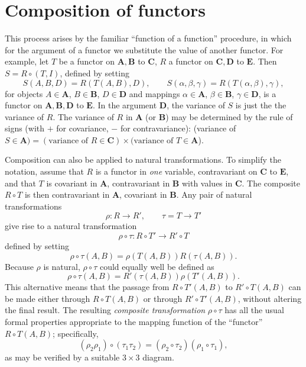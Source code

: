 \documentclass[11pt,a4paper]{report}
\begin{document}
\section{Composition of functors}\label{sec:funct_comp}
This process arises by the familiar ``function of a function'' procedure, in which for the argument of a
functor we substitute the value of another functor. For example, let $T$ be a functor on $\mathbf{A,B}$
to $\mathbf{C}$, $R$ a functor on $\mathbf{C,D}$ to $\mathbf{E}$. Then $S=R\circ (T,I)$, defined by
setting
\begin{equation*}
	S(A,B,D) = R(T(A,B),D),\qquad S(\alpha,\beta,\gamma)= R(T(\alpha,\beta),\gamma),
\end{equation*}
for objects $A\in\mathbf{A}$, $B\in\mathbf{B}$, $D\in\mathbf{D}$ and mappings $\alpha\in\mathbf{A}$,
$\beta\in\mathbf{B}$, $\gamma\in\mathbf{D}$, is a functor on $\mathbf{A,B,D}$ to $\mathbf{E}$.
In the argument $\mathbf{D}$, the variance of $S$ is just the the variance of $R$. The variance of 
$R$ in $\mathbf{A}$ (or $\mathbf{B}$) may be determined by the rule of signs (with $+$ for covariance,
$-$ for contravariance): (variance of $S\in\mathbf{A})=(\text{variance of } R\in\mathbf{C})\times
(\text{variance of } T\in\mathbf{A}$).

Composition can also be applied to natural transformations. To simplify the notation, assume that $R$ is
a functor in \emph{one} variable, contravariant on $\mathbf{C}$ to $\mathbf{E}$, and that $T$ is
covariant in $\mathbf{A}$, contravariant in $\mathbf{B}$ with values in $\mathbf{C}$. The composite
$R\circ T$ is then contravariant in $\mathbf{A}$, covariant in $\mathbf{B}$. Any pair of natural
transformations
\begin{equation*}
	\rho:R\rightarrow R',\qquad \tau=T\rightarrow T'
\end{equation*}
give rise to a natural transformation
\begin{equation*}
	\rho\circ\tau : R\circ T'\rightarrow R'\circ T
\end{equation*}
defined by setting
\begin{equation*}
	\rho\circ\tau(A,B)=\rho(T(A,B)) R(\tau(A,B)).
\end{equation*}
Because $\rho$ is natural, $\rho\circ\tau$ could equally well be defined as
\begin{equation*}
	\rho\circ\tau(A,B)= R'(\tau(A,B))\rho(T'(A,B)).
\end{equation*}
This alternative means that the passage from $R\circ T'(A,B)$ to $R'\circ T(A,B)$
can be made either through  $R\circ T(A,B)$ or through  $R'\circ T'(A,B)$, without
altering the final result. The resulting \emph{composite transformation} $\rho\circ\tau$
has all the usual formal properties appropriate to the mapping function of the ``functor''
$R\circ T(A,B)$; specifically,
\begin{equation*}
	(\rho_2\rho_1)\circ (\tau_1\tau_2) = (\rho_2\circ \tau_2)(\rho_1\circ\tau_1),
\end{equation*}
as may be verified by a suitable $3\times 3$ diagram.
\end{document}
